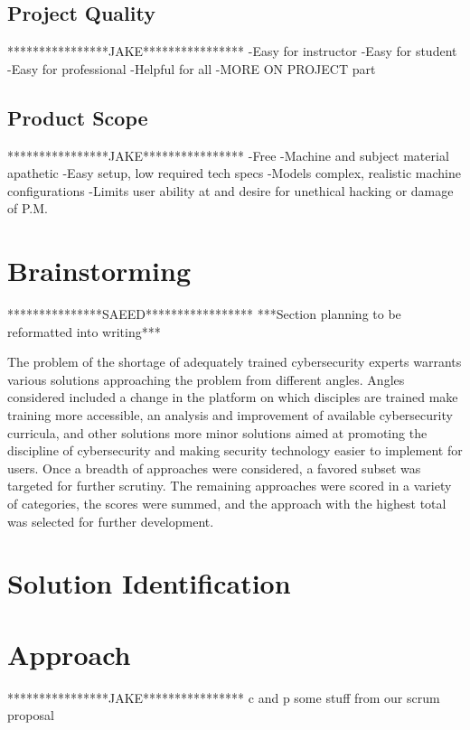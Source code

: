 \documentclass[openright]{report}
\begin{document}
\subsection{Project Quality}
****************JAKE****************
-Easy for instructor
-Easy for student
-Easy for professional
-Helpful for all
-MORE ON PROJECT part

\subsection{Product Scope}
****************JAKE****************
-Free
-Machine and subject material apathetic
-Easy setup, low required tech specs
-Models complex, realistic machine configurations
-Limits user ability at and desire for unethical hacking or damage of P.M.

\section{Brainstorming}

***************SAEED*****************
***Section planning to be reformatted into writing***

\par The problem of the shortage of adequately trained cybersecurity experts warrants various solutions approaching the problem from different angles. Angles considered included a change in the platform on which disciples are trained make training more accessible, an analysis and improvement of available cybersecurity curricula, and other solutions more minor solutions aimed at promoting the discipline of cybersecurity and making security technology easier to implement for users. Once a breadth of approaches were considered, a favored subset was targeted for further scrutiny. The remaining approaches were scored in a variety of categories, the scores were summed, and the approach with the highest total was selected for further development. 
\par 


\section{Solution Identification}

\section{Approach}
****************JAKE****************
c and p some stuff from our scrum proposal
\end{document}
